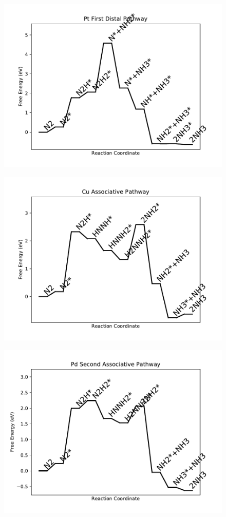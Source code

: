 \begin{figure}
\includegraphics[width=0.8\linewidth]{data/plots/Pt_distal_1.pdf}
\end{figure}

\begin{figure}
\includegraphics[width=0.8\linewidth]{data/plots/Cu_associative.pdf}
\end{figure}

\begin{figure}
\includegraphics[width=0.8\linewidth]{data/plots/Pd_associative_2.pdf}
\end{figure}

